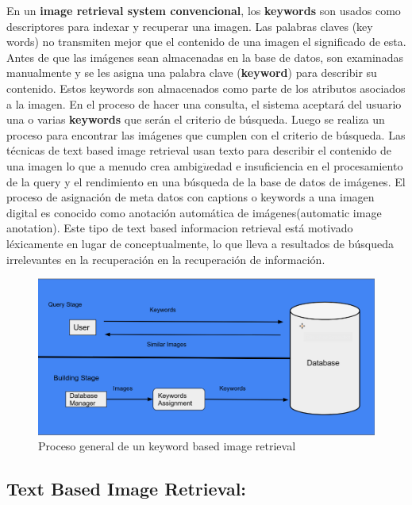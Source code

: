 \documentclass{llncs}
\begin{document}
En un \textbf{image retrieval system convencional}, los \textbf{keywords} son 
usados como descriptores para indexar y recuperar una imagen.  Las palabras 
claves (key words) no transmiten mejor que el contenido de una imagen 
el significado de esta. Antes de que las imágenes sean almacenadas en la base de datos, son examinadas 
manualmente y se les asigna una palabra  clave (\textbf{keyword}) para describir su 
contenido. Estos  keywords  son almacenados como parte de los atributos 
asociados a la imagen. En el proceso de hacer una consulta, el sistema 
aceptará del usuario una o varias \textbf{keywords} que serán el criterio de búsqueda.
Luego se realiza un proceso para encontrar las imágenes que cumplen con el criterio 
de búsqueda. Las t\'ecnicas de text based image retrieval usan texto para describir el 
contenido de una imagen lo que a menudo crea ambig$\ddot{u}$edad e insuficiencia en el 
procesamiento de la query y el rendimiento en una b\'usqueda de la base de datos de 
im\'agenes. El proceso de asignaci\'on de meta datos con captions o keywords a una imagen
digital es conocido como anotaci\'on autom\'atica de im\'agenes(automatic image anotation).
Este tipo de text based informacion retrieval est\'a motivado l\'exicamente en lugar de 
conceptualmente, lo que lleva a resultados de b\'usqueda irrelevantes en la recuperaci\'on en la 
recuperaci\'on de informaci\'on.
\\
\begin{figure}
    \caption{Proceso general de un keyword based image retrieval}
    \includegraphics[scale = .3]{./images/kbir-process.png}
\end{figure}

\subsection{Text Based Image Retrieval:}
\end{document}
